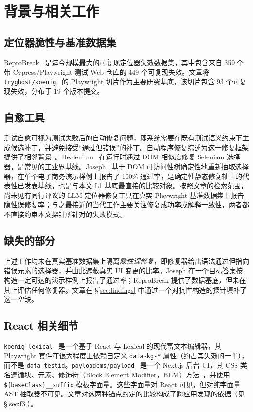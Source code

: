 \section{背景与相关工作}
\label{sec:background}

\subsection{定位器脆性与基准数据集}
ReproBreak~\cite{mouraReproBreak2026} 是迄今规模最大的可复现定位器失效数据集，其中包含来自 359 个带 Cypress/Playwright 测试 Web 仓库的 449 个可复现失效。文章将 \texttt{tryghost/koenig}~\cite{koenig} 的 Playwright 切片作为主要研究基底，该切片包含 93 个可复现失效，分布于 19 个版本提交。

\subsection{自愈工具}
测试自愈可视为测试失败后的自动修复问题，即系统需要在既有测试语义约束下生成候选补丁，并避免接受“通过但错误”的补丁。自动程序修复综述为这一修复框架提供了相邻背景~\cite{li2019programRepair}。Healenium~\cite{healenium} 在运行时通过 DOM 相似度修复 Selenium 选择器，是常见的工业界基线。Joseph~\cite{joseph2026zerocost} 基于 DOM 可访问性树确定性地重新抽取选择器，在单个电子商务演示样例上报告了 100\% 通过率，是确定性静态修复轴上的代表性已发表基线，也是与本文 L1 基底最直接的比较对象。按照文章的检索范围，尚未见有同行评议的 LLM 定位器修复工具在真实 Playwright 基准数据集上报告隐性误修复率；与之最接近的当代工作主要关注修复成功率或解释一致性，两者都不直接约束本文探针所针对的失败模式。

\subsection{缺失的部分}
上述工作均未在真实基准数据集上隔离\emph{隐性误修复}，即修复器给出语法通过但指向错误元素的选择器，并由此遮蔽真实 UI 变更的比率。Joseph 在一个目标答案按构造一定可达的演示样例上报告了通过率；ReproBreak 提供了数据基底，但未在其上评估任何修复器。文章在 \S\ref{sec:findings} 中通过一个对抗性构造的探针填补了这一空缺。

\subsection{React 相关细节}
\texttt{koenig-lexical}~\cite{lexicalRichText, koenig} 是一个基于 React 与 Lexical 的现代富文本编辑器，其 Playwright 套件在很大程度上依赖自定义 \texttt{data-kg-*} 属性（约占其失效的一半），而不是 \texttt{data-testid}。\texttt{payloadcms/payload}~\cite{payloadCMS} 是一个 Next.js 后台 UI，其 CSS 类名遵循块、元素、修饰符（Block Element Modifier，BEM）方法~\cite{bemMethodology}，并使用 \texttt{\$\{baseClass\}\_\_suffix} 模板字面量。这些字面量对 React 可见，但对纯字面量 AST 抽取器不可见。文章对这两种锚点约定的比较构成了跨应用发现的依据（见 \S\ref{sec:f3}）。
